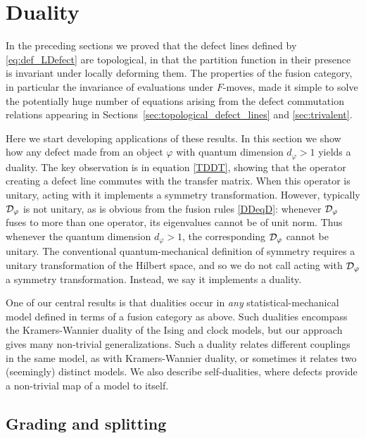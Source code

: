 
\section{Duality}
\label{sec:duality}
In the preceding sections we proved that the defect lines defined by \eqref{eq:def_LDefect} are topological, in that the partition function in their presence is invariant under locally deforming them. The properties of the fusion category, in particular the invariance of evaluations under $F$-moves,  made it simple to solve the potentially huge number of equations arising from the defect commutation relations appearing in Sections~\ref{sec:topological_defect_lines} and \ref{sec:trivalent}.

Here we start developing applications of these results. In this section we show how any defect made from an object $\varphi$ with quantum dimension $d_\varphi>1$ yields a {duality}.  The key observation is in equation \eqref{TDDT}, showing that the operator creating a defect line commutes with the transfer matrix. When this operator is unitary, acting with it implements a symmetry transformation.
However, typically 
$\mathcal{D}_{\varphi}$ is not unitary, as is obvious from the fusion rules \eqref{DDeqD}: whenever $\mathcal{D}_{\varphi}$ fuses to more than one operator, its eigenvalues cannot be of unit norm. Thus whenever the quantum dimension $d_\varphi>1$, the corresponding $\mathcal{D}_{\varphi}$ cannot be unitary.  The conventional quantum-mechanical definition of symmetry requires a unitary transformation of the Hilbert space, and so we do not call acting with $\mathcal{D}_\varphi$ a symmetry transformation. Instead, we say it implements a {duality}. 

One of our central results is that dualities occur in {\em any} statistical-mechanical model defined in terms of a fusion category as above. Such dualities encompass the Kramers-Wannier duality of the Ising \cite{Kramers1941} and clock \cite{Wu1982} models, but our approach gives many non-trivial generalizations. Such a duality relates different couplings in the same model, as with Kramers-Wannier duality, or sometimes it relates two (seemingly) distinct models. We also describe self-dualities, where defects provide a non-trivial map of a model to itself. 


\subsection{Grading and splitting}
\label{sec:splitting}

